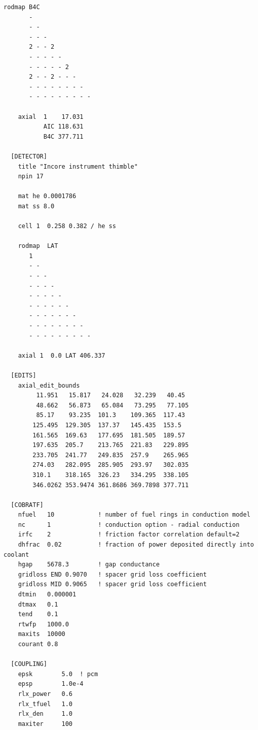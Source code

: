 \begin{Verbatim}[fontsize=\small]
    rodmap B4C
       -
       - -
       - - -
       2 - - 2
       - - - - -
       - - - - - 2
       2 - - 2 - - -
       - - - - - - - -
       - - - - - - - - -

    axial  1    17.031
           AIC 118.631
           B4C 377.711

  [DETECTOR]
    title "Incore instrument thimble"
    npin 17

    mat he 0.0001786
    mat ss 8.0

    cell 1  0.258 0.382 / he ss

    rodmap  LAT
       1
       - -
       - - -
       - - - -
       - - - - -
       - - - - - -
       - - - - - - -
       - - - - - - - -
       - - - - - - - - -

    axial 1  0.0 LAT 406.337

  [EDITS]
    axial_edit_bounds
         11.951   15.817   24.028   32.239   40.45
         48.662   56.873   65.084   73.295   77.105
         85.17    93.235  101.3    109.365  117.43
        125.495  129.305  137.37   145.435  153.5
        161.565  169.63   177.695  181.505  189.57
        197.635  205.7    213.765  221.83   229.895
        233.705  241.77   249.835  257.9    265.965
        274.03   282.095  285.905  293.97   302.035
        310.1    318.165  326.23   334.295  338.105
        346.0262 353.9474 361.8686 369.7898 377.711

  [COBRATF]
    nfuel   10            ! number of fuel rings in conduction model
    nc      1             ! conduction option - radial conduction
    irfc    2             ! friction factor correlation default=2
    dhfrac  0.02          ! fraction of power deposited directly into coolant
    hgap    5678.3        ! gap conductance
    gridloss END 0.9070   ! spacer grid loss coefficient
    gridloss MID 0.9065   ! spacer grid loss coefficient
    dtmin   0.000001
    dtmax   0.1
    tend    0.1
    rtwfp   1000.0
    maxits  10000
    courant 0.8

  [COUPLING]
    epsk        5.0  ! pcm
    epsp        1.0e-4
    rlx_power   0.6
    rlx_tfuel   1.0
    rlx_den     1.0
    maxiter     100

\end{Verbatim}

